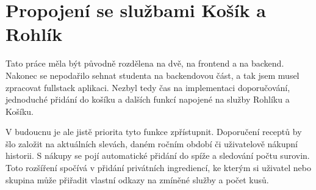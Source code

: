 \section{Propojení se službami Košík a Rohlík}
Tato práce měla být původně rozdělena na dvě, na frontend a na backend. Nakonec se nepodařilo sehnat studenta na backendovou část,
a tak jsem musel zpracovat fullstack aplikaci. Nezbyl tedy čas na implementaci doporučování, jednoduché přidání do košíku a dalších
funkcí napojené na služby Rohlíku a Košíku.

V budoucnu je ale jistě priorita tyto funkce zpřístupnit. Doporučení receptů by šlo založit na aktuálních slevách, daném ročním období či
uživatelově nákupní historii. S nákupy se pojí automatické přidání do spíže a sledování počtu surovin. Toto rozšíření spočívá v přidání
privátních ingrediencí, ke kterým si uživatel nebo skupina může přiřadit vlastní odkazy na zmíněné služby a počet kusů.
